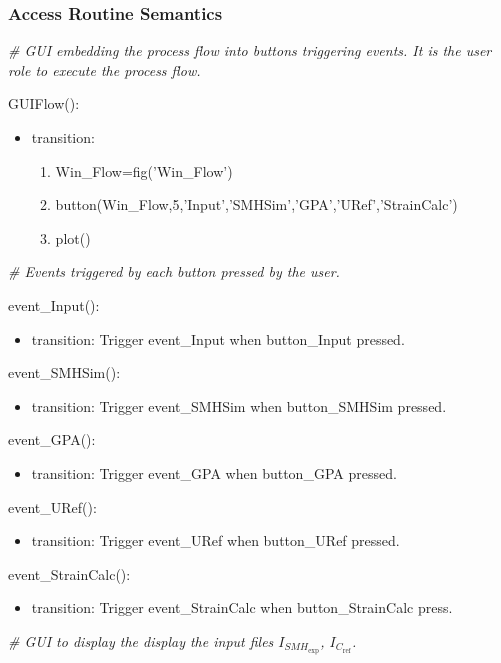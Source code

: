 \documentclass[12pt, titlepage]{article}
\begin{document}
\subsubsection{Access Routine Semantics}

\noindent\textit{{\#} GUI embedding the process flow into buttons triggering 
events. It is the user role to execute the process flow.}\medskip

\noindent GUIFlow():
\begin{itemize}
\item transition: 
	\begin{enumerate}
	\item Win{\_}Flow=fig('Win{\_}Flow') 
	\item button(Win{\_}Flow,5,'Input','SMHSim','GPA','URef','StrainCalc') 
	\item plot()
	\end{enumerate} 
\end{itemize}
\bigskip

\noindent\textit{{\#} Events triggered by each button pressed by the 
user.}\medskip

\noindent event{\_}Input():
\begin{itemize}
\item transition: Trigger event{\_}Input when button{\_}Input pressed.
\end{itemize}
\bigskip
\noindent event{\_}SMHSim():
\begin{itemize}
\item transition: Trigger event{\_}SMHSim when button{\_}SMHSim pressed.
\end{itemize}
\bigskip
\noindent event{\_}GPA():
\begin{itemize}
\item transition: Trigger event{\_}GPA when button{\_}GPA pressed.
\end{itemize}
\bigskip
\noindent event{\_}URef():
\begin{itemize}
\item transition: Trigger event{\_}URef when button{\_}URef pressed.
\end{itemize}
\bigskip
\noindent event{\_}StrainCalc():
\begin{itemize}
\item transition: Trigger event{\_}StrainCalc when button{\_}StrainCalc press.
\end{itemize}
\bigskip

\noindent\textit{{\#} GUI to display the display the input files 
$I_{\mathit{SMH}_{\text{exp}}}$, $I_{C_{\text{ref}}}$.}\medskip
\end{document}
